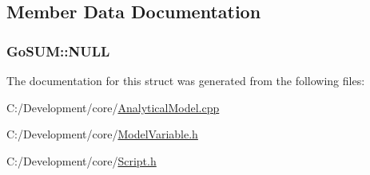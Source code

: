 \subsection{Member Data Documentation}
\hypertarget{struct_go_s_u_m_a3e6605d298c4dcd991f606a654a6cae4}{
\subsubsection[{N\-U\-L\-L}]{\setlength{\rightskip}{0pt plus 5cm}Go\-S\-U\-M\-::\-N\-U\-L\-L}}\label{struct_go_s_u_m_a3e6605d298c4dcd991f606a654a6cae4}


The documentation for this struct was generated from the following files\-:\begin{DoxyCompactItemize}
\item 
C\-:/\-Development/core/\hyperlink{_analytical_model_8cpp}{Analytical\-Model.\-cpp}\item 
C\-:/\-Development/core/\hyperlink{_model_variable_8h}{Model\-Variable.\-h}\item 
C\-:/\-Development/core/\hyperlink{_script_8h}{Script.\-h}\end{DoxyCompactItemize}
